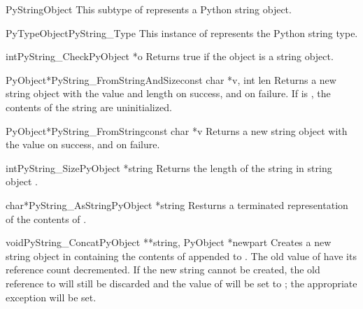 \documentclass{manual}
\begin{document}
\begin{ctypedesc}{PyStringObject}
This subtype of  represents a Python string object.
\end{ctypedesc}

\begin{cvardesc}{PyTypeObject}{PyString_Type}
This instance of  represents the Python string type.
\end{cvardesc}

\begin{cfuncdesc}{int}{PyString_Check}{PyObject *o}
Returns true if the object  is a string object.
\end{cfuncdesc}

\begin{cfuncdesc}{PyObject*}{PyString_FromStringAndSize}{const char *v,
                                                          int len}
Returns a new string object with the value  and length
 on success, and \NULL{} on failure.  If  is \NULL{},
the contents of the string are uninitialized.
\end{cfuncdesc}

\begin{cfuncdesc}{PyObject*}{PyString_FromString}{const char *v}
Returns a new string object with the value  on success, and
\NULL{} on failure.
\end{cfuncdesc}

\begin{cfuncdesc}{int}{PyString_Size}{PyObject *string}
Returns the length of the string in string object .
\end{cfuncdesc}

\begin{cfuncdesc}{char*}{PyString_AsString}{PyObject *string}
Resturns a \NULL{} terminated representation of the contents of .
\end{cfuncdesc}

\begin{cfuncdesc}{void}{PyString_Concat}{PyObject **string,
                                         PyObject *newpart}
Creates a new string object in  containing the
contents of  appended to .  The old value of
 have its reference count decremented.  If the new string
cannot be created, the old reference to  will still be
discarded and the value of  will be set to
\NULL{}; the appropriate exception will be set.
\end{cfuncdesc}
\end{document}
